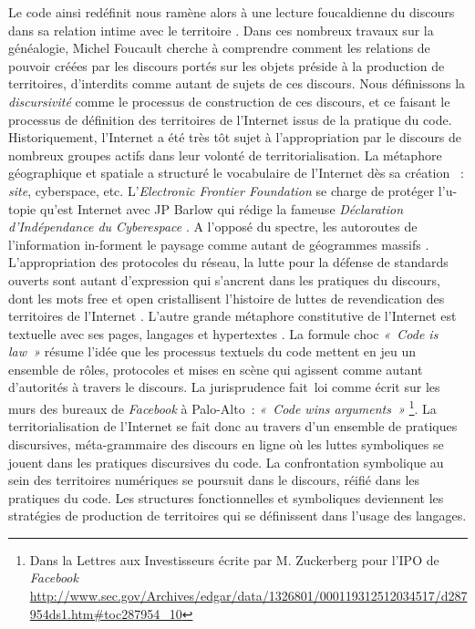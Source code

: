 Le code ainsi redéfinit nous ramène alors à une lecture foucaldienne du discours dans sa relation intime avec le territoire \citep{Foucault2004}. Dans ces nombreux travaux sur la généalogie, Michel Foucault cherche à comprendre comment les relations de pouvoir créées par les discours portés sur les objets préside à la production de territoires, d’interdits comme autant de sujets de ces discours. Nous définissons la \textit{discursivité} comme le processus de construction de ces discours, et ce faisant le processus de définition des territoires de l’Internet issus de la pratique du code. Historiquement, l’Internet a été très tôt sujet à l’appropriation par le discours de nombreux groupes actifs dans leur volonté de territorialisation. La métaphore géographique et spatiale a structuré le vocabulaire de l’Internet dès sa création \citep{Graham1998} : \textit{site}, cyberspace, etc. L’\textit{Electronic Frontier Foundation} se charge de protéger l’u-topie qu’est Internet avec JP Barlow qui rédige la fameuse \textit{Déclaration d’Indépendance du Cyberespace} \citep{Barlow2001}. A l’opposé du spectre, les autoroutes de l’information in-forment le paysage comme autant de géogrammes massifs \citep{Berque1999}. L’appropriation des protocoles du réseau, la lutte pour la défense de standards ouverts sont autant d’expression qui s’ancrent dans les pratiques du discours, dont les mots free et open cristallisent l’histoire de luttes de revendication des territoires de l’Internet \citep{Blondeau2000}. L’autre grande métaphore constitutive de l’Internet est textuelle avec ses pages, langages et hypertextes \citep{Vandendorpe1999}. La formule choc \textit{« Code is law »} \citep{Lessig2006} résume l’idée  que les processus textuels du code mettent en jeu un ensemble de rôles, protocoles et mises en scène qui agissent comme autant d’autorités à travers le discours. La jurisprudence fait loi comme écrit sur les murs des bureaux de \textit{Facebook} à Palo-Alto : \textit{« Code wins arguments »} \footnote{Dans la Lettres aux Investisseurs écrite par M. Zuckerberg  pour l’IPO de \textit{Facebook} \url{http://www.sec.gov/Archives/edgar/data/1326801/000119312512034517/d287954ds1.htm\#toc287954_10}}. La territorialisation de l’Internet se fait donc au travers d’un ensemble de pratiques discursives, méta-grammaire des discours en ligne où les luttes symboliques se jouent dans les pratiques discursives du code. La confrontation symbolique au sein des territoires numériques se poursuit dans le discours, réifié dans les pratiques du code. Les structures fonctionnelles et symboliques deviennent les stratégies de production de territoires qui se définissent dans l’usage des langages. 

